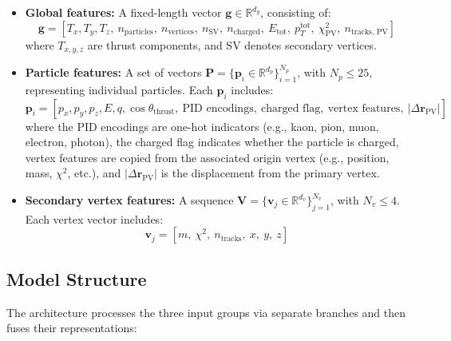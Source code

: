 \documentclass[11pt]{article}
\begin{document}
\begin{itemize}
    \item \textbf{Global features:} A fixed-length vector \( \mathbf{g} \in \mathbb{R}^{d_g} \), consisting of:
    \[
    \mathbf{g} = \left[ T_x, T_y, T_z,\ n_{\text{particles}},\ n_{\text{vertices}},\ n_{\text{SV}},\ n_{\text{charged}},\ E_{\text{tot}},\ p_T^{\text{tot}},\ \chi^2_{\text{PV}},\ n_{\text{tracks, PV}} \right]
    \]
    where \( T_{x,y,z} \) are thrust components, and SV denotes secondary vertices.
        
    \item \textbf{Particle features:} A set of vectors \( \mathbf{P} = \{ \mathbf{p}_i \in \mathbb{R}^{d_p} \}_{i=1}^{N_p} \), with \( N_p \leq 25 \), representing individual particles. Each \( \mathbf{p}_i \) includes:
    \[
    \mathbf{p}_i = \left[ p_x, p_y, p_z, E, q, \cos\theta_{\text{thrust}},\ \text{PID encodings},\ \text{charged flag},\ \text{vertex features},\ |\Delta \mathbf{r}_{\text{PV}}| \right]
    \]
    where the PID encodings are one-hot indicators (e.g., kaon, pion, muon, electron, photon), the charged flag indicates whether the particle is charged, vertex features are copied from the associated origin vertex (e.g., position, mass, \(\chi^2\), etc.), and \( |\Delta \mathbf{r}_{\text{PV}}| \) is the displacement from the primary vertex.
    
    \item \textbf{Secondary vertex features:} A sequence \( \mathbf{V} = \{ \mathbf{v}_j \in \mathbb{R}^{d_v} \}_{j=1}^{N_v} \), with \( N_v \leq 4 \). Each vertex vector includes:
    \[
    \mathbf{v}_j = \left[ m,\ \chi^2,\ n_{\text{tracks}},\ x,\ y,\ z \right]
    \]
\end{itemize}



\subsection{Model Structure}

The architecture processes the three input groups via separate branches and then fuses their representations:
\end{document}

